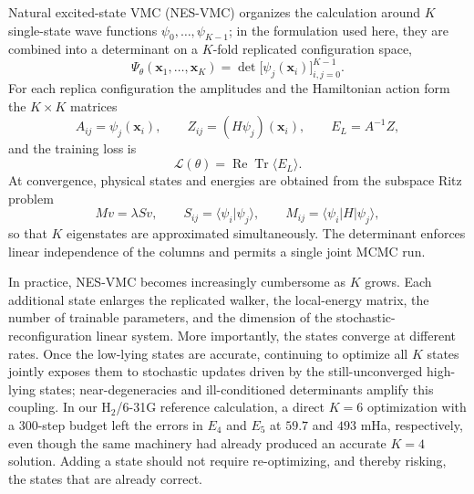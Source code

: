 \documentclass[11pt,a4paper]{article}
\newcommand{\braket}[2]{\langle #1\vert #2\rangle}
\newcommand{\bramat}[3]{\langle #1\vert #2\vert #3\rangle}
\newcommand{\Tr}{\operatorname{Tr}}
\begin{document}
Natural excited-state VMC (NES-VMC) \citep{pfau2024} organizes the calculation around $K$ single-state wave functions $\psi_0,\ldots,\psi_{K-1}$; in the formulation used here, they are combined into a determinant on a $K$-fold replicated configuration space,
\begin{equation}
\Psi_\theta(\mathbf{x}_1,\ldots,\mathbf{x}_K)
= \det\bigl[\psi_j(\mathbf{x}_i)\bigr]_{i,j=0}^{K-1}.
\label{eq:nes}
\end{equation}
For each replica configuration the amplitudes and the Hamiltonian action form the $K\times K$ matrices
\begin{equation}
A_{ij}=\psi_j(\mathbf{x}_i),
\qquad
Z_{ij}=(H\psi_j)(\mathbf{x}_i),
\qquad
E_L=A^{-1}Z,
\label{eq:local}
\end{equation}
and the training loss is
\begin{equation}
\mathcal{L}(\theta)=\operatorname{Re}\Tr\langle E_L\rangle .
\label{eq:loss}
\end{equation}
At convergence, physical states and energies are obtained from the subspace Ritz problem
\begin{equation}
M v=\lambda S v,
\qquad
S_{ij}=\braket{\psi_i}{\psi_j},
\qquad
M_{ij}=\bramat{\psi_i}{H}{\psi_j},
\label{eq:ritz}
\end{equation}
so that $K$ eigenstates are approximated simultaneously. The determinant enforces linear independence of the columns and permits a single joint MCMC run.

In practice, NES-VMC becomes increasingly cumbersome as $K$ grows. Each additional state enlarges the replicated walker, the local-energy matrix, the number of trainable parameters, and the dimension of the stochastic-reconfiguration linear system. More importantly, the states converge at different rates. Once the low-lying states are accurate, continuing to optimize all $K$ states jointly exposes them to stochastic updates driven by the still-unconverged high-lying states; near-degeneracies and ill-conditioned determinants amplify this coupling. In our H$_2$/6-31G reference calculation, a direct $K=6$ optimization with a 300-step budget left the errors in $E_4$ and $E_5$ at $59.7$ and $493$ mHa, respectively, even though the same machinery had already produced an accurate $K=4$ solution. Adding a state should not require re-optimizing, and thereby risking, the states that are already correct.
\end{document}
